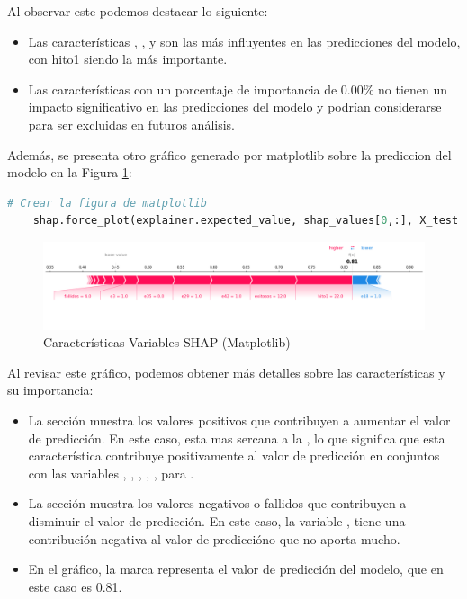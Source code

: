 Al observar este podemos destacar lo siguiente:

\begin{itemize}
    \item Las características , ,  y  son las más influyentes en las predicciones del modelo, con hito1 siendo la más importante.
    \item Las características con un porcentaje de importancia de 0.00\% no tienen un impacto significativo en las predicciones del modelo y podrían considerarse para ser excluidas en futuros análisis.
\end{itemize}

Además, se presenta otro gráfico generado por matplotlib sobre la prediccion del modelo en la Figura \ref{fig:caract_var_shap_mat}:

\begin{lstlisting}[language=Python, caption=grafico matplotib, label=lst:graf_matplotib]
    # Crear la figura de matplotlib
    shap.force_plot(explainer.expected_value, shap_values[0,:], X_test.iloc[0,:], matplotlib=True)
\end{lstlisting}

\begin{figure}[H]
    \centering
    \includegraphics[width=1\textwidth]{img/shap_rf/shapForcePlot.png}
    \caption{Características Variables SHAP (Matplotlib)}
    \label{fig:caract_var_shap_mat}
\end{figure}

Al revisar este gráfico, podemos obtener más detalles sobre las características y su importancia:

\begin{itemize}
    \item La sección  muestra los valores positivos que contribuyen a aumentar el valor de predicción. En este caso,  esta mas sercana a la , lo que significa que esta característica contribuye positivamente al valor de predicción en conjuntos con las variables , , , , ,  para .
    \item La sección  muestra los valores negativos o fallidos que contribuyen a disminuir el valor de predicción. En este caso, la variable , tiene una contribución negativa al valor de prediccióno que no aporta mucho.
    \item En el gráfico, la marca  representa el valor de predicción del modelo, que en este caso es 0.81.
\end{itemize}

